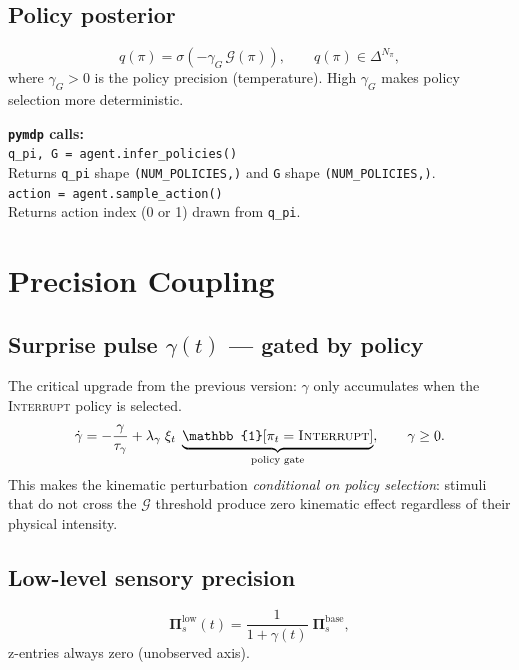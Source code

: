 \documentclass[11pt, a4paper]{article}
\newcommand{\mat}[1]{\mathbf{#1}}
\newcommand{\EFE}{\mathcal{G}}
\newcommand{\Pisl}{\mat{\Pi}_s^{\mathrm{low}}}
\begin{document}
\subsection{Policy posterior}
\begin{equation}
  q(\pi) = \sigma\!\left(-\gamma_G\,\EFE(\pi)\right),
  \qquad
  q(\pi) \in \Delta^{N_\pi},
  \label{eq:q_pi}
\end{equation}
where $\gamma_G > 0$ is the policy precision (temperature).
High $\gamma_G$ makes policy selection more deterministic.

\begin{pymdpbox}
\textbf{\texttt{pymdp} calls:}\\
\texttt{q\_pi, G = agent.infer\_policies()}\\
Returns \texttt{q\_pi} shape \texttt{(NUM\_POLICIES,)} and
\texttt{G} shape \texttt{(NUM\_POLICIES,)}.\\[4pt]
\texttt{action = agent.sample\_action()}\\
Returns action index (0 or 1) drawn from \texttt{q\_pi}.
\end{pymdpbox}

\section{Precision Coupling}

\subsection{Surprise pulse $\gamma(t)$ — gated by policy}
The critical upgrade from the previous version: $\gamma$ only accumulates
when the \textsc{Interrupt} policy is selected.
\begin{equation}
  \dot{\gamma} = -\frac{\gamma}{\tau_\gamma}
    + \lambda_\gamma\;\xi_t\;\underbrace{\mathbb{1}[\pi_t = \textsc{Interrupt}]}_{\text{policy gate}},
  \qquad \gamma \geq 0.
  \label{eq:gamma_gated}
\end{equation}
This makes the kinematic perturbation \emph{conditional on policy selection}:
stimuli that do not cross the $\EFE$ threshold produce zero kinematic
effect regardless of their physical intensity.

\subsection{Low-level sensory precision}
\begin{equation}
  \Pisl(t) = \frac{1}{1+\gamma(t)}\;\mat{\Pi}_s^{\mathrm{base}},
  \label{eq:pisl}
\end{equation}
z-entries always zero (unobserved axis).
\end{document}
